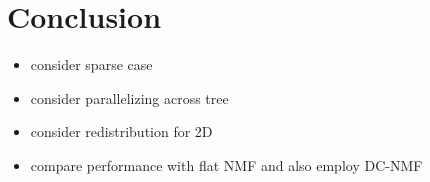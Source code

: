 
\section{Conclusion}

\begin{itemize}
	\item consider sparse case
	\item consider parallelizing across tree
	\item consider redistribution for 2D
	\item compare performance with flat NMF and also employ DC-NMF
\end{itemize}

